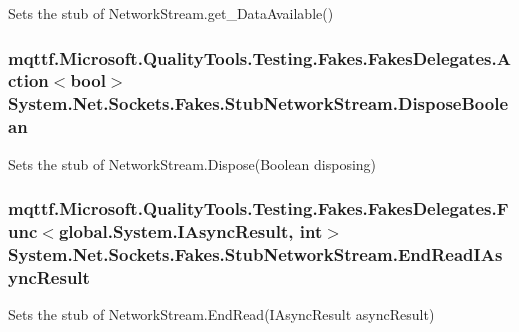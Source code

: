 Sets the stub of Network\-Stream.\-get\-\_\-\-Data\-Available()

\hypertarget{class_system_1_1_net_1_1_sockets_1_1_fakes_1_1_stub_network_stream_a6d42717e5de4bef02ac4aacc6b019490}{
\subsubsection[{Dispose\-Boolean}]{\setlength{\rightskip}{0pt plus 5cm}mqttf.\-Microsoft.\-Quality\-Tools.\-Testing.\-Fakes.\-Fakes\-Delegates.\-Action$<$bool$>$ System.\-Net.\-Sockets.\-Fakes.\-Stub\-Network\-Stream.\-Dispose\-Boolean}}\label{class_system_1_1_net_1_1_sockets_1_1_fakes_1_1_stub_network_stream_a6d42717e5de4bef02ac4aacc6b019490}


Sets the stub of Network\-Stream.\-Dispose(\-Boolean disposing)

\hypertarget{class_system_1_1_net_1_1_sockets_1_1_fakes_1_1_stub_network_stream_a0d65abf86c23200970a6363f9e402490}{
\subsubsection[{End\-Read\-I\-Async\-Result}]{\setlength{\rightskip}{0pt plus 5cm}mqttf.\-Microsoft.\-Quality\-Tools.\-Testing.\-Fakes.\-Fakes\-Delegates.\-Func$<$global.\-System.\-I\-Async\-Result, int$>$ System.\-Net.\-Sockets.\-Fakes.\-Stub\-Network\-Stream.\-End\-Read\-I\-Async\-Result}}\label{class_system_1_1_net_1_1_sockets_1_1_fakes_1_1_stub_network_stream_a0d65abf86c23200970a6363f9e402490}


Sets the stub of Network\-Stream.\-End\-Read(\-I\-Async\-Result async\-Result)

